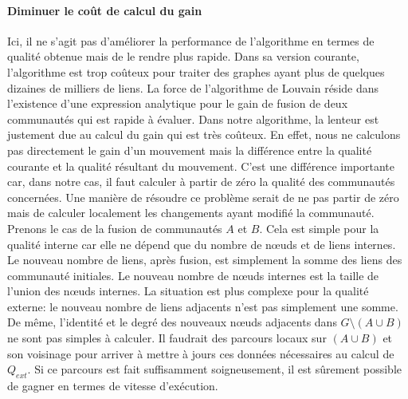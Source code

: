 \paragraph{Diminuer le coût de calcul du gain}
Ici, il ne s'agit pas d'améliorer la performance de l'algorithme en termes de qualité obtenue mais de le rendre plus rapide.
Dans sa version courante, l'algorithme est trop coûteux pour traiter des graphes ayant plus de quelques dizaines de milliers de liens.
La force de l'algorithme de Louvain réside dans l'existence d'une expression analytique pour le gain de fusion de deux communautés qui est rapide à évaluer.
Dans notre algorithme, la lenteur est justement due au calcul du gain qui est très coûteux.
En effet, nous ne calculons pas directement le gain d'un mouvement mais la différence entre la qualité courante et la qualité résultant du mouvement.
C'est une différence importante car, dans notre cas, il faut calculer à partir de zéro la qualité des communautés concernées.
Une manière de résoudre ce problème serait de ne pas partir de zéro mais de calculer localement les changements ayant modifié la communauté.
Prenons le cas de la fusion de communautés $A$ et $B$.
Cela est simple pour la qualité interne car elle ne dépend que du nombre de n\oe{}uds et de liens internes.
Le nouveau nombre de liens, après fusion, est simplement la somme des liens des communauté initiales.
Le nouveau nombre de n\oe{}uds internes est la taille de l'union des n\oe{}uds internes.
La situation est plus complexe pour la qualité externe: le nouveau nombre de liens adjacents n'est pas simplement une somme.
De même, l'identité et le degré des nouveaux n\oe{}uds adjacents dans $G \setminus (A \cup B)$ ne sont pas simples à calculer.
Il faudrait des parcours locaux sur $(A \cup B)$ et son voisinage pour arriver à mettre à jours ces données nécessaires au calcul de $Q_{ext}$. 
Si ce parcours est fait suffisamment soigneusement, il est sûrement possible de gagner en termes de vitesse d'exécution.


